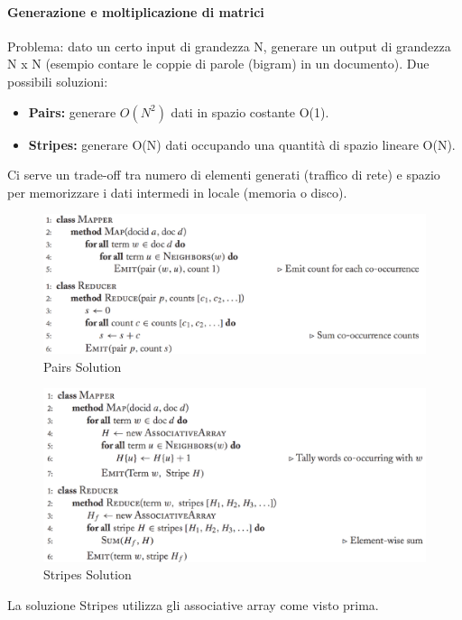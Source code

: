 \documentclass{article}
\begin{document}
\begin{appendices}
\paragraph{Generazione e moltiplicazione di matrici}
Problema: dato un certo input di grandezza N, generare un output di grandezza N x N (esempio contare le coppie di parole (bigram) in un documento). Due possibili soluzioni:
\begin{itemize}
    \item \textbf{Pairs:} generare $O(N^2)$ dati in spazio costante O(1).
    \item \textbf{Stripes:} generare O(N) dati occupando una quantità di spazio lineare O(N).  
\end{itemize}
Ci serve un trade-off tra numero di elementi generati (traffico di rete) e spazio per memorizzare i dati intermedi in locale (memoria o disco).
\begin{figure}[H]
    \centering
    \includegraphics[scale=0.5]{img/Pairs.PNG}
    \caption{Pairs Solution}
\end{figure}
\begin{figure}[H]
    \centering
    \includegraphics[scale=0.5]{img/Stripes.PNG}
    \caption{Stripes Solution}
\end{figure}
La soluzione Stripes utilizza gli associative array come visto prima.


\end{appendices}
\end{document}
